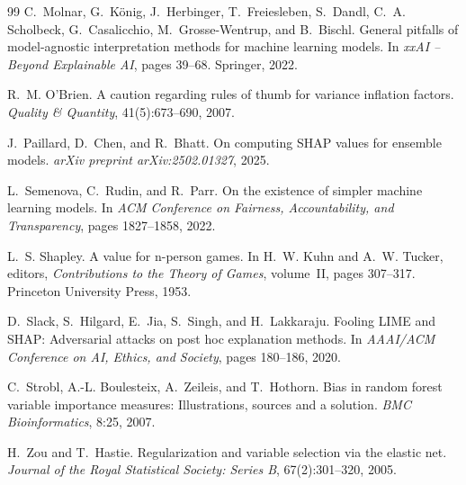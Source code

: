 \documentclass[11pt]{article}
\begin{document}
\begin{thebibliography}{99}
C.~Molnar, G.~K{\"o}nig, J.~Herbinger, T.~Freiesleben, S.~Dandl,
  C.~A. Scholbeck, G.~Casalicchio, M.~Grosse-Wentrup, and B.~Bischl.
\newblock General pitfalls of model-agnostic interpretation methods for
  machine learning models.
\newblock In \emph{xxAI -- Beyond Explainable AI}, pages 39--68. Springer,
  2022.

R.~M. O'Brien.
\newblock A caution regarding rules of thumb for variance inflation factors.
\newblock \emph{Quality \& Quantity}, 41(5):673--690, 2007.

J.~Paillard, D.~Chen, and R.~Bhatt.
\newblock On computing {SHAP} values for ensemble models.
\newblock \emph{arXiv preprint arXiv:2502.01327}, 2025.

L.~Semenova, C.~Rudin, and R.~Parr.
\newblock On the existence of simpler machine learning models.
\newblock In \emph{ACM Conference on Fairness, Accountability, and
  Transparency}, pages 1827--1858, 2022.

L.~S. Shapley.
\newblock A value for n-person games.
\newblock In H.~W. Kuhn and A.~W. Tucker, editors, \emph{Contributions to the
  Theory of Games}, volume~II, pages 307--317. Princeton University Press, 1953.

D.~Slack, S.~Hilgard, E.~Jia, S.~Singh, and H.~Lakkaraju.
\newblock Fooling {LIME} and {SHAP}: Adversarial attacks on post hoc
  explanation methods.
\newblock In \emph{AAAI/ACM Conference on AI, Ethics, and Society}, pages
  180--186, 2020.

C.~Strobl, A.-L. Boulesteix, A.~Zeileis, and T.~Hothorn.
\newblock Bias in random forest variable importance measures: Illustrations,
  sources and a solution.
\newblock \emph{BMC Bioinformatics}, 8:25, 2007.

H.~Zou and T.~Hastie.
\newblock Regularization and variable selection via the elastic net.
\newblock \emph{Journal of the Royal Statistical Society: Series B},
  67(2):301--320, 2005.

\end{thebibliography}


\appendix
\end{document}
